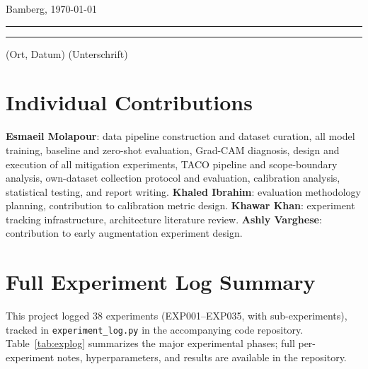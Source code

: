 \documentclass[a4paper]{article}
\begin{document}
\vspace{2\baselineskip}
Bamberg, \today

\rule[0.5em]{14em}{0.5pt} \hspace{0.25\linewidth}\rule[0.5em]{14em}{0.5pt}
\vspace{1em}

\hspace{4em} (Ort, Datum) \hspace{0.51\linewidth} (Unterschrift)

\section*{Individual Contributions}
\textbf{Esmaeil Molapour}: data pipeline construction and dataset curation, all model training, baseline and zero-shot evaluation, Grad-CAM diagnosis, design and execution of all mitigation experiments, TACO pipeline and scope-boundary analysis, own-dataset collection protocol and evaluation, calibration analysis, statistical testing, and report writing. \textbf{Khaled Ibrahim}: evaluation methodology planning, contribution to calibration metric design. \textbf{Khawar Khan}: experiment tracking infrastructure, architecture literature review. \textbf{Ashly Varghese}: contribution to early augmentation experiment design.

\appendix

\section{Full Experiment Log Summary}
\label{app:experiments}
This project logged 38 experiments (EXP001--EXP035, with sub-experiments), tracked in \texttt{experiment\_log.py} in the accompanying code repository. Table~\ref{tab:explog} summarizes the major experimental phases; full per-experiment notes, hyperparameters, and results are available in the repository.
\end{document}
